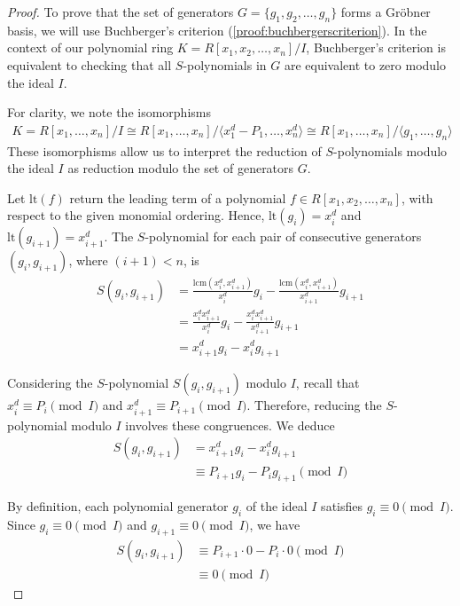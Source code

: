\documentclass[12pt,reqno]{article}
\theoremstyle{plain}
\newcommand{\lcm}{\mathrm{lcm}}
\newcommand{\lt}{\mathrm{lt}}
\begin{document}
\begin{proof}
To prove that the set of generators $G = \{ g_1, g_2, \ldots, g_n \}$ forms a Gröbner basis, we will use Buchberger's criterion (\cref{proof:buchbergerscriterion}). In the context of our polynomial ring $K = R[x_1, x_2, \ldots, x_n]/I$, Buchberger's criterion is equivalent to checking that all $S$-polynomials in $G$ are equivalent to zero modulo the ideal $I$.

For clarity, we note the isomorphisms
\begin{align*}
    K = R[x_1, \ldots, x_n]/I
    \cong R[x_1, \ldots, x_n]/\langle x_1^d - P_1, \ldots, x_n^d \rangle
    \cong R[x_1, \ldots, x_n]/\langle g_1, \ldots, g_n \rangle
\end{align*}
These isomorphisms allow us to interpret the reduction of $S$-polynomials modulo the ideal $I$ as reduction modulo the set of generators $G$.

Let $\lt(f)$ return the leading term of a polynomial $f \in R[x_1, x_2, \ldots, x_n]$, with respect to the given monomial ordering. Hence, $\lt(g_i) = x_i^d$ and $\lt(g_{i+1}) = x_{i+1}^d$. The $S$-polynomial for each pair of consecutive generators $(g_i,g_{i+1})$, where $(i+1) < n$, is 
\begin{align*}
S(g_i, g_{i+1}) &= \frac{\lcm(x_i^d, x_{i+1}^d)}{x_i^d} g_i
- \frac{\lcm(x_i^d, x_{i+1}^d)}{x_{i+1}^d} g_{i+1} \\
&= \frac{x_i^d x_{i+1}^d}{x_i^d} g_i - \frac{x_i^d x_{i+1}^d}{x_{i+1}^d} g_{i+1} \\
&= x_{i+1}^d g_i - x_i^d g_{i+1}
\end{align*}

Considering the $S$-polynomial $S(g_i, g_{i+1})$ modulo $I$, recall that $x_i^d \equiv P_i \pmod{I}$ and $x_{i+1}^d \equiv P_{i+1} \pmod{I}$. Therefore, reducing the $S$-polynomial modulo $I$ involves these congruences. We deduce
\begin{align*}
S(g_i, g_{i+1}) &= x_{i+1}^d g_i - x_i^d g_{i+1} \\
&\equiv P_{i+1} g_i - P_i g_{i+1} \pmod{I}
\end{align*}

By definition, each polynomial generator $g_i$ of the ideal $I$ satisfies $g_i \equiv 0 \pmod{I}$. Since $g_i \equiv 0 \pmod{I}$ and $g_{i+1} \equiv 0 \pmod{I}$, we have
\begin{align*}
S(g_i, g_{i+1}) &\equiv P_{i+1} \cdot 0 - P_i \cdot 0 \pmod{I} \\
&\equiv 0 \pmod{I}
\end{align*}


\end{proof}
\end{document}
